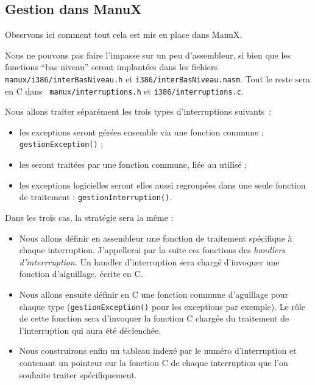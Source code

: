 \begin{itemize}
%      
\section{Gestion dans ManuX}

   Observons ici comment tout cela est mis en place dans ManuX.

   Nous ne pouvons pas faire l'impasse sur un peu d'assembleur, si
bien que les fonctions ``bas niveau'' seront implantées dans les
fichiers {\tt manux/i386/interBasNiveau.h} et
\lstinline!i386/interBasNiveau.nasm!. Tout le reste sera en C dans {\tt
  manux/interruptions.h} et {\tt i386/interruptions.c}.

   Nous allons traiter séparément les trois types d'interruptions
suivants~:

\begin{itemize}
   \item les exceptions seront gérées ensemble via une fonction
     commune : \lstinline!gestionException()! ;
   \item les \irq seront traitées par une fonction commune, liée au \pic
     utilisé ;
   \item les exceptions logicielles seront elles aussi regroupées dans
     une seule fonction de traitement :
     \lstinline!gestionInterruption()!. 
\end{itemize}

   Dans les trois cas, la stratégie sera la même :

\begin{itemize}
   \item Nous allons définir en assembleur une fonction de traitement
     spécifique à chaque interruption. J'appellerai par la suite ces
     fonctions des {\em handlers d'interrruption}. Un handler
     d'interruption sera chargé d'invoquer une fonction d'aiguillage,
     écrite en C.
   \item Nous allons ensuite définir en C une fonction commune
     d'aguillage pour chaque type (\lstinline!gestionException()! pour
     les exceptions par exemple). Le rôle de cette fonction sera
     d'invoquer la fonction C chargée du traitement de l'interruption
     qui aura été déclenchée.
   \item Nous construirons enfin un tableau indexé par le numéro
     d'interruption et contenant un pointeur sur la fonction C de
     chaque interruption que l'on souhaite traiter spécifiquement.
\end{itemize}


\end{itemize}
